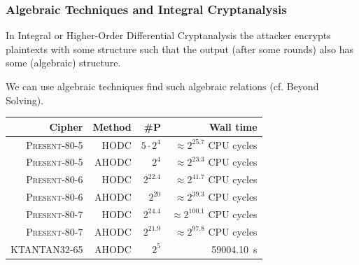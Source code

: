 \documentclass[9pt]{beamer}
\newcommand{\PRESENT}{\textsc{Present}\xspace}
\begin{document}
\begin{frame}
\frametitle{Algebraic Techniques and Integral Cryptanalysis} 

In Integral or Higher-Order Differential Cryptanalysis the attacker encrypts plaintexts with some structure such that the output (after some rounds) also has some (algebraic) structure. 

\vspace{1em}

We can use algebraic techniques find such algebraic relations (cf. Beyond Solving).

\begin{table}[htbp]
\begin{center}
\begin{tabular}{|r|r|r|r|}
\hline
Cipher & Method & \#P & Wall time\\
\hline
\PRESENT-80-5 &  HODC & $5\cdot 2^4$ & $\approx 2^{25.7}$ CPU cycles\\
\PRESENT-80-5 & AHODC & $2^4$ & $\approx 2^{23.3}$  CPU cycles\\
\PRESENT-80-6 &  HODC & $2^{22.4}$ & $\approx 2^{41.7}$  CPU cycles\\
\PRESENT-80-6 & AHODC & $2^{20}$ & $\approx 2^{39.3}$  CPU cycles\\
\PRESENT-80-7 &  HODC & $2^{24.4}$ & $\approx 2^{100.1}$  CPU cycles\\
\PRESENT-80-7 & AHODC & $2^{21.9}$ & $\approx 2^{97.8}$  CPU cycles\\
\hline
KTANTAN32-65 & AHODC & $2^5$& 59004.10~s\\
\hline
\end{tabular}
\end{center}
\end{table}
\end{frame}
\end{document}
